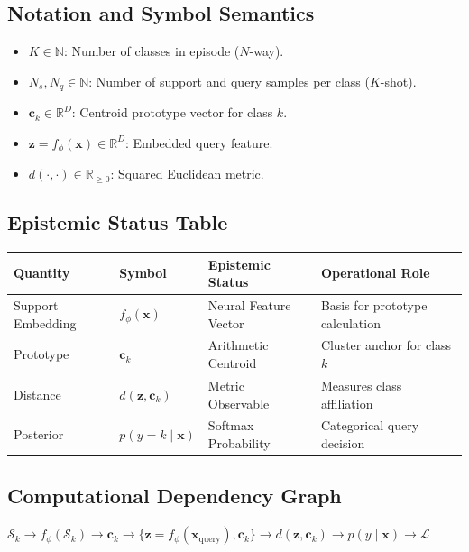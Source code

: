 \documentclass[11pt,a4paper]{article}
\theoremstyle{definition}
\begin{document}
\subsection{Notation and Symbol Semantics}
\begin{itemize}
    \item $K \in \mathbb{N}$: Number of classes in episode ($N$-way).
    \item $N_s, N_q \in \mathbb{N}$: Number of support and query samples per class ($K$-shot).
    \item $\mathbf{c}_k \in \mathbb{R}^D$: Centroid prototype vector for class $k$.
    \item $\mathbf{z} = f_\phi(\mathbf{x}) \in \mathbb{R}^D$: Embedded query feature.
    \item $d(\cdot, \cdot) \in \mathbb{R}_{\ge 0}$: Squared Euclidean metric.
\end{itemize}

\subsection{Epistemic Status Table}
\begin{table}[h]
\centering
\small
\begin{tabular}{@{}llll@{}}
\toprule
\textbf{Quantity} & \textbf{Symbol} & \textbf{Epistemic Status} & \textbf{Operational Role} \\
\midrule
Support Embedding & $f_\phi(\mathbf{x})$ & Neural Feature Vector & Basis for prototype calculation \\
Prototype & $\mathbf{c}_k$ & Arithmetic Centroid & Cluster anchor for class $k$ \\
Distance & $d(\mathbf{z}, \mathbf{c}_k)$ & Metric Observable & Measures class affiliation \\
Posterior & $p(y = k \mid \mathbf{x})$ & Softmax Probability & Categorical query decision \\
\bottomrule
\end{tabular}
\end{table}

\subsection{Computational Dependency Graph}
{\centering
$\mathcal{S}_k \longrightarrow f_\phi(\mathcal{S}_k) \longrightarrow \mathbf{c}_k \longrightarrow \{\mathbf{z} = f_\phi(\mathbf{x}_{\text{query}}), \mathbf{c}_k\} \longrightarrow d(\mathbf{z}, \mathbf{c}_k) \longrightarrow p(y \mid \mathbf{x}) \longrightarrow \mathcal{L}$
\par}
\end{document}
